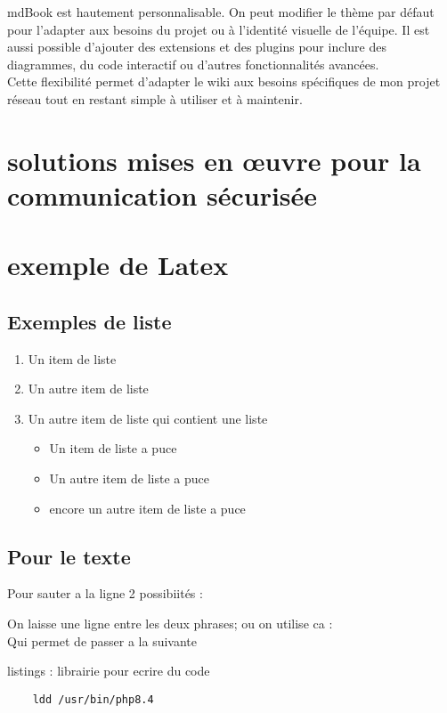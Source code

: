 \documentclass{article}
\begin{document}
mdBook est hautement personnalisable. On peut modifier le thème par défaut pour l’adapter aux besoins du projet ou à l’identité visuelle de l’équipe. Il est aussi possible d’ajouter des extensions et des plugins pour inclure des diagrammes, du code interactif ou d’autres fonctionnalités avancées.\\

Cette flexibilité permet d’adapter le wiki aux besoins spécifiques de mon projet réseau tout en restant simple à utiliser et à maintenir.

\section{solutions mises en œuvre pour la communication sécurisée}

\section{exemple de Latex}

\subsection{Exemples de liste}
\begin{enumerate}
    \item Un item de liste
    \item Un autre item de liste
    \item Un autre item de liste qui contient une liste 
        \begin{itemize}
        \item  Un item de liste a puce
        \item  Un autre item de liste a puce
        \item  encore un autre item de liste a puce
        \end{itemize}
\end{enumerate}

\subsection{Pour le texte}
Pour sauter a la ligne 2 possibiités : 

On laisse une ligne entre les deux phrases; ou on utilise ca : \\
Qui permet de passer a la suivante

listings : librairie pour ecrire du code
\begin{lstlisting}
    ldd /usr/bin/php8.4
\end{lstlisting} 
\end{document}
